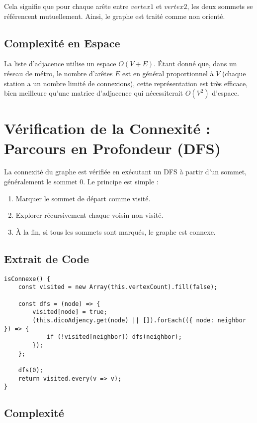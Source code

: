 \documentclass[a4paper,12pt]{article}
\begin{document}
Cela signifie que pour chaque arête entre $vertex1$ et $vertex2$, les deux sommets se référencent mutuellement. Ainsi, le graphe est traité comme non orienté.

\subsection{Complexité en Espace}

La liste d’adjacence utilise un espace $O(V+E)$. Étant donné que, dans un réseau de métro, le nombre d’arêtes $E$ est en général proportionnel à $V$ (chaque station a un nombre limité de connexions), cette représentation est très efficace, bien meilleure qu’une matrice d’adjacence qui nécessiterait $O(V^2)$ d’espace.

\section{Vérification de la Connexité : Parcours en Profondeur (DFS)}

La connexité du graphe est vérifiée en exécutant un DFS à partir d’un sommet, généralement le sommet $0$. Le principe est simple :
\begin{enumerate}
    \item Marquer le sommet de départ comme visité.
    \item Explorer récursivement chaque voisin non visité.
    \item À la fin, si tous les sommets sont marqués, le graphe est connexe.
\end{enumerate}

\subsection{Extrait de Code}

\begin{verbatim}
isConnexe() {
    const visited = new Array(this.vertexCount).fill(false);

    const dfs = (node) => {
        visited[node] = true;
        (this.dicoAdjency.get(node) || []).forEach(({ node: neighbor }) => {
            if (!visited[neighbor]) dfs(neighbor);
        });
    };

    dfs(0);
    return visited.every(v => v);
}
\end{verbatim}

\subsection{Complexité}
\end{document}

